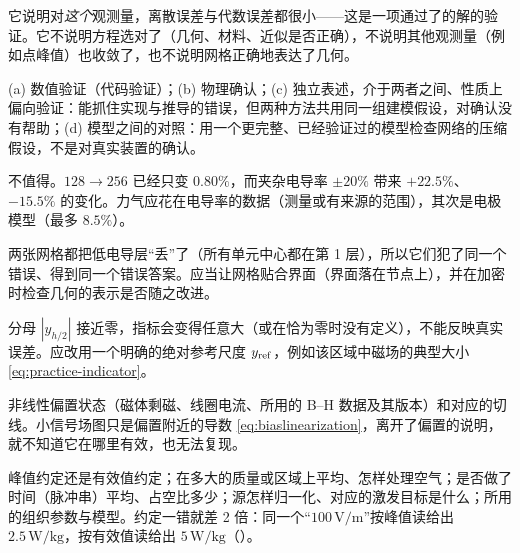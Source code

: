 \begin{answers}
\item 它说明对\emph{这个}观测量，离散误差与代数误差都很小——这是一项通过了的解的验证。它不说明方程选对了（几何、材料、近似是否正确），不说明其他观测量（例如点峰值）也收敛了，也不说明网格正确地表达了几何。
\item (a) 数值验证（代码验证）；(b) 物理确认；(c) 独立表述，介于两者之间、性质上偏向验证：能抓住实现与推导的错误，但两种方法共用同一组建模假设，对确认没有帮助；(d) 模型之间的对照：用一个更完整、已经验证过的模型检查网络的压缩假设，不是对真实装置的确认。
\item 不值得。$128\to256$ 已经只变 $0.80\%$，而夹杂电导率 $\pm20\%$ 带来 $+22.5\%$、$-15.5\%$ 的变化。力气应花在电导率的数据（测量或有来源的范围），其次是电极模型（最多 $8.5\%$）。
\item 两张网格都把低电导层“丢”了（所有单元中心都在第 1 层），所以它们犯了同一个错误、得到同一个错误答案。应当让网格贴合界面（界面落在节点上），并在加密时检查几何的表示是否随之改进。
\item 分母 $|y_{h/2}|$ 接近零，指标会变得任意大（或在恰为零时没有定义），不能反映真实误差。应改用一个明确的绝对参考尺度 $y_{\rm ref}$，例如该区域中磁场的典型大小 \eqref{eq:practice-indicator}。
\item 非线性偏置状态（磁体剩磁、线圈电流、所用的 B--H 数据及其版本）和对应的切线。小信号场图只是偏置附近的导数 \eqref{eq:biaslinearization}，离开了偏置的说明，就不知道它在哪里有效，也无法复现。
\item 峰值约定还是有效值约定；在多大的质量或区域上平均、怎样处理空气；是否做了时间（脉冲串）平均、占空比多少；源怎样归一化、对应的激发目标是什么；所用的组织参数与模型。约定一错就差 2 倍：同一个“$100\,\mathrm{V/m}$”按峰值读给出 $2.5\,\mathrm{W/kg}$，按有效值读给出 $5\,\mathrm{W/kg}$（）。
\end{answers}
